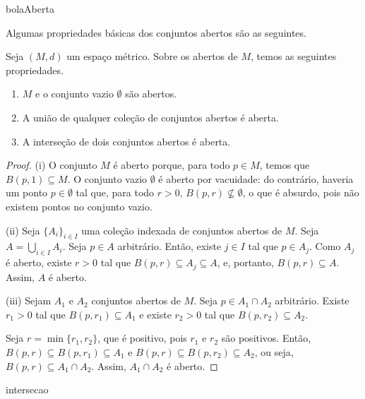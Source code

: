 {bolaAberta}

Algumas propriedades básicas dos conjuntos abertos são as seguintes.

\begin{proposition}\label{prop:propriedadesAbertos}
    Seja $(M,d)$ um espaço métrico.
    Sobre os abertos de $M$, temos as seguintes propriedades.
    \begin{enumerate}[label=(\roman*)]
        \item $M$ e o conjunto vazio $\emptyset$ são abertos.
        \item A união de qualquer coleção de conjuntos abertos é aberta.
        \item A interseção de dois conjuntos abertos é aberta.
    \end{enumerate}
\end{proposition}
\begin{proof}
    (i) O conjunto $M$ é aberto porque, para todo $p \in M$, temos que $B(p, 1) \subseteq M$.
    O conjunto vazio $\emptyset$ é aberto por vacuidade: do contrário, haveria um ponto $p \in \emptyset$ tal que, para todo $r>0$, $B(p, r)\not\subseteq \emptyset$, o que é absurdo, pois não existem pontos no conjunto vazio.

    (ii) Seja $\{A_i\}_{i \in I}$ uma coleção indexada de conjuntos abertos de $M$.
    Seja $A = \bigcup_{i \in I} A_i$.
    Seja $p \in A$ arbitrário.
    Então, existe $j \in I$ tal que $p \in A_j$.
    Como $A_j$ é aberto, existe $r>0$ tal que $B(p, r) \subseteq A_j\subseteq A$, e, portanto, $B(p, r) \subseteq A$.
    Assim, $A$ é aberto.

    (iii) Sejam $A_1$ e $A_2$ conjuntos abertos de $M$.
    Seja $p \in A_1\cap A_2$ arbitrário.
    Existe $r_1>0$ tal que $B(p, r_1) \subseteq A_1$ e existe $r_2>0$ tal que $B(p, r_2) \subseteq A_2$.
    
    Seja $r = \min\{r_1, r_2\}$, que é positivo, pois $r_1$ e $r_2$ são positivos.
    Então, $B(p, r) \subseteq B(p, r_1) \subseteq A_1$ e $B(p, r) \subseteq B(p, r_2) \subseteq A_2$, ou seja, $B(p, r) \subseteq A_1\cap A_2$.
    Assim, $A_1\cap A_2$ é aberto.
\end{proof}
{intersecao}


